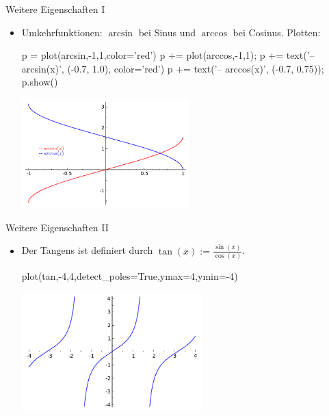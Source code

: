 \documentclass[notes=hide,hyperref={dvipdfmx,pdfpagelabels=false}]{beamer}
\begin{document}
\begin{frame}[fragile]{Weitere Eigenschaften I}
\begin{itemize}
\item Umkehrfunktionen: $\arcsin$ bei Sinus und $\arccos$ bei Cosinus.
Plotten: 
\begin{sagein}
p = plot(arcsin,-1,1,color='red')
p += plot(arccos,-1,1); 
p += text('-- arcsin(x)', (-0.7, 1.0), color='red')
p += text('-- arccos(x)', (-0.7, 0.75)); p.show()
\end{sagein}
\begin{center}
\includegraphics[width=6.5cm]{figures/arcsinarccos.pdf}
\end{center}
\end{itemize}
\end{frame}

\begin{frame}[fragile]{Weitere Eigenschaften II}
\begin{itemize}
\item Der {\color{red} Tangens} ist definiert durch
$\tan(x) :=\frac{\sin(x)}{\cos(x)}$.
\begin{sagein}
plot(tan,-4,4,detect_poles=True,ymax=4,ymin=-4)
\end{sagein}
\begin{center}
\includegraphics[width=7cm]{figures/tan.pdf}
\end{center}
\end{itemize}
\end{frame}
\end{document}
